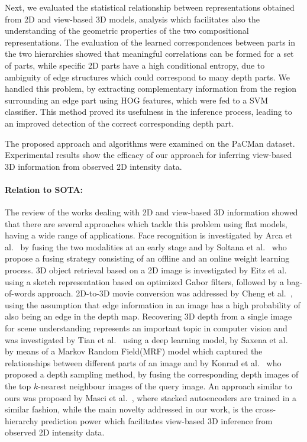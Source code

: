 \documentclass[a4paper,11pt,pdf]{../templates/pacmanreport}
\begin{document}
Next, we evaluated the statistical relationship between representations obtained from 2D and view-based 3D models, analysis which facilitates also the understanding of the geometric properties of the two compositional representations. The evaluation of the learned correspondences between parts in the two hierarchies showed that meaningful correlations can be formed for a set of parts, while specific 2D parts have a high conditional entropy, due to ambiguity of edge structures which could correspond to many depth parts. We handled this problem, by extracting complementary information from the region surrounding an edge part using HOG features, which were fed to a SVM classifier. This method proved its usefulness in the inference process, leading to an improved detection of the correct corresponding depth part.

The proposed approach and algorithms were examined on the PaCMan dataset. Experimental results show the efficacy of our approach for inferring view-based 3D information from observed 2D intensity data. 

\paragraph{Relation to SOTA:} 

The review of the works dealing with 2D and view-based 3D information showed that there are several approaches which tackle this problem using flat models, having a wide range of applications. Face recognition is investigated by Arca et al.~\cite{Arca2007} by fusing the two modalities at an early stage and by Soltana et al.~\cite{Soltana2010} who propose a fusing strategy consisting of an offline and an online weight learning process. 3D object retrieval based on a 2D image is investigated by Eitz et al.~\cite{Eitz2012} using a sketch representation based on optimized Gabor filters, followed by a bag-of-words approach. 2D-to-3D movie conversion was addressed by Cheng et al.~\cite{Cheng2010}, using the assumption that edge information in an image has a high probability of also being an edge in the depth map.
Recovering 3D depth from a single image for scene understanding represents an important topic in computer vision and was investigated by Tian et al.~\cite{Tian2014} using a deep learning model, by Saxena et al.~\cite{Saxena2009} by means of a Markov Random Field(MRF) model which captured the relationships between different parts of an image and by Konrad et al.~\cite{Konrad2012} who proposed a depth sampling method, by fusing the corresponding depth images of the top $k$-nearest neighbour images of the query image.
An approach similar to ours was proposed by Masci et al.~\cite{Masci2011}, where stacked autoencoders are trained in a similar fashion, while the main novelty addressed in our work, is the cross-hierarchy prediction power which facilitates view-based 3D inference from observed 2D intensity data.
\end{document}
